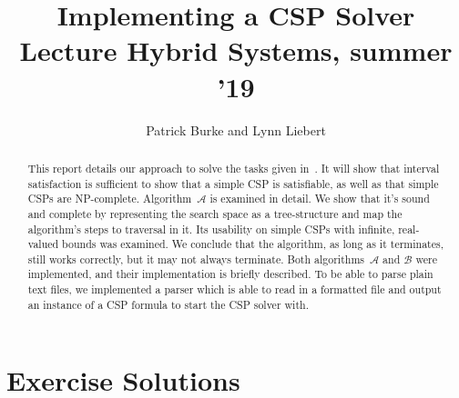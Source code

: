 \documentclass{article}
\title{Implementing a CSP Solver\\\small{Lecture Hybrid Systems, summer '19}}
\author{Patrick Burke and Lynn Liebert}
\begin{document}
\maketitle %

\listoftodos

\begin{abstract}
This report details our approach to solve the tasks given in~\cite{MF19}.
It will show that interval satisfaction is sufficient to show that a simple CSP is satisfiable, as well as that simple CSPs are NP-complete.
Algorithm~$\mathcal{A}$ is examined in detail.
We show that it's sound and complete by representing the search space as a tree-structure and map the algorithm's steps to traversal in it.
Its usability on simple CSPs with infinite, real-valued bounds was examined.
We conclude that the algorithm, as long as it terminates, still works correctly, but it may not always terminate.
Both algorithms~$\mathcal{A}$ and $\mathcal{B}$ were implemented, and their implementation is briefly described.
To be able to parse plain text files, we implemented a parser which is able to read in a formatted file and output an instance of a CSP formula to start the CSP solver with.
\end{abstract}

\tableofcontents
\newpage


\newpage


\section{Exercise Solutions}\label{sec:exercise-solutions}












%

\clearpage
\appendix
\appendixpage




\end{document}
